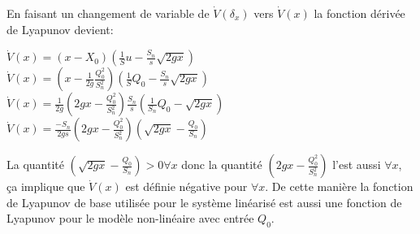 		En faisant un changement de variable de $ \dot{V}(\delta_x) $ vers $ \dot{V}(x) $ la fonction dérivée de Lyapunov devient:
		\begin{center}
			
		 $\dot{V}(x) = (x - X_0 ) ( \frac{1}{S} u - \frac{S_n}{s} \sqrt{2 g x}) $\\[0.25 cm]		
		
		 $\dot{V}(x) = (x - \frac{1}{2g} \frac{Q^2_0}{S^2_n} ) ( \frac{1}{S} Q_0 - \frac{S_n}{s} \sqrt{2 g x}) $\\[0.25 cm]
		 $ \dot{V}(x) = \frac{1}{2g} (2g x - \frac{Q^2_0}{S^2_n} ) \frac{S_n}{s}( \frac{1}{S_n} Q_0 - \sqrt{2 g x})$ \\[0.25 cm]
		 $ \dot{V}(x) =\frac{-S_n}{2gs}(2g x - \frac{Q^2_0}{S^2_n} ) ( \sqrt{2gx} - \frac{Q_0}{S_n} ) $
		 \end{center}
		 
	\par La quantité $ ( \sqrt{2gx} - \frac{Q_0}{S_n} ) > 0 \forall x  $ donc la quantité $ (2g x - \frac{Q^2_0}{S^2_n} ) $ l'est aussi $\forall x$, ça implique que $ \dot{V}(x) $ est définie négative pour $\forall x$. De cette manière la fonction de Lyapunov de base utilisée pour le système linéarisé est aussi une fonction de Lyapunov pour le modèle non-linéaire avec entrée $Q_0$.
	  		 